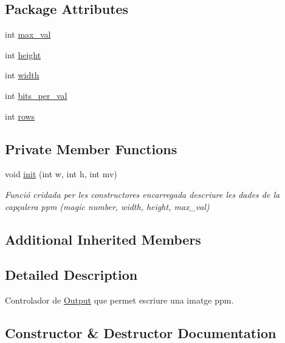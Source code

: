 \subsection*{Package Attributes}
\begin{DoxyCompactItemize}
\item 
int \hyperlink{classpersistencia_1_1output_1_1Ctrl__Output__Img_ab9e685dae026afe43188c62d7c4fad53}{max\+\_\+val}
\item 
int \hyperlink{classpersistencia_1_1output_1_1Ctrl__Output__Img_a1d7bc52c64c79e8545ae6d1ae8b9ee2e}{height}
\item 
int \hyperlink{classpersistencia_1_1output_1_1Ctrl__Output__Img_ae4a01ec459078cece4815d2fe7db8a64}{width}
\item 
int \hyperlink{classpersistencia_1_1output_1_1Ctrl__Output__Img_ad40e63d16abd9058889249f5ad84f200}{bits\+\_\+per\+\_\+val}
\item 
int \hyperlink{classpersistencia_1_1output_1_1Ctrl__Output__Img_a586ee8128a26b6786471e040a705bdbc}{rows}
\end{DoxyCompactItemize}
\subsection*{Private Member Functions}
\begin{DoxyCompactItemize}
\item 
void \hyperlink{classpersistencia_1_1output_1_1Ctrl__Output__Img_aab3258280bd6abb81d580c93eb68fb28}{init} (int w, int h, int mv)
\begin{DoxyCompactList}\small\item\em Funció cridada per les constructores encarregada d\textquotesingle{}escriure les dades de la capçalera ppm (magic number, width, height, max\+\_\+val) \end{DoxyCompactList}\end{DoxyCompactItemize}
\subsection*{Additional Inherited Members}


\subsection{Detailed Description}
Controlador de \hyperlink{classpersistencia_1_1output_1_1Output}{Output} que permet escriure una imatge ppm. 

\subsection{Constructor \& Destructor Documentation}
\mbox{\label{classpersistencia_1_1output_1_1Ctrl__Output__Img_aa3f2948dd4645d8b121eedf30daa0c3f}} 
